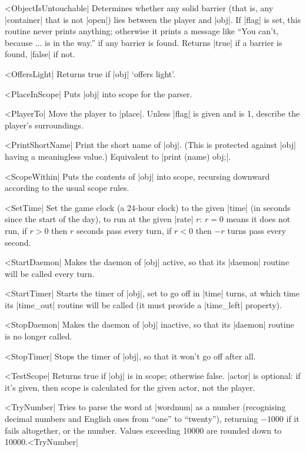 ^^|ObjectIsUntouchable|
Determines whether any solid barrier (that is, any |container| that
is not |open|) lies between the player and |obj|.  If |flag| is set,
this routine never prints anything; otherwise it prints a message
like ``You can't, because ... is in the way.'' if any barrier is
found.  Returns |true| if a barrier is found, |false| if not.

^^|OffersLight|
Returns true if |obj| `offers light'.

^^|PlaceInScope|
Puts |obj| into scope for the parser.

^^|PlayerTo|
Move the player to |place|.  Unless
|flag| is given and is 1, describe the player's surroundings.

^^|PrintShortName|
Print the short name of |obj|.
(This is protected against |obj| having a meaningless value.)
Equivalent to |print (name) obj;|.

^^|ScopeWithin|
Puts the contents of |obj| into scope,
recursing downward according to the usual scope rules.

^^|SetTime|
Set the game clock (a 24-hour clock) to the
given |time| (in seconds since the start of the day), to run at the given |rate|
$r$: $r=0$ means it does not run, if $r>0$ then $r$ seconds pass every turn,
if $r<0$ then $-r$ turns pass every second.

^^|StartDaemon|
Makes the daemon of |obj| active, so
that its |daemon| routine will be called every turn.

^^|StartTimer|
Starts the timer of |obj|, set
to go off in |time| turns, at which time its |time_out| routine will be called
(it must provide a |time_left| property).

^^|StopDaemon|
Makes the daemon of |obj| inactive, so
that its |daemon| routine is no longer called.

^^|StopTimer|
Stops the timer of |obj|, so that
it won't go off after all.

^^|TestScope|
Returns true if |obj| is in scope; otherwise false.  |actor|
is optional: if it's given, then scope is calculated for the
given actor, not the player.

^^|TryNumber|
Tries to parse the word at |wordnum| as a
number (recognising decimal numbers and English ones from ``one'' to
``twenty''), returning $-1000$ if it fails altogether, or the number.
Values exceeding 10000 are rounded down to 10000.^^|TryNumber|

